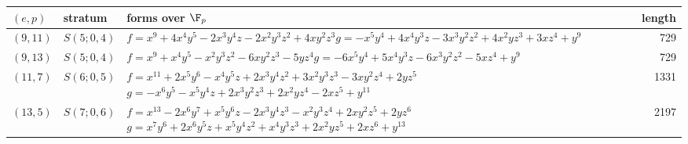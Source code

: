 \begin{tabular}{@{}ll>{\raggedright\arraybackslash}p{6.4cm}r@{}}
\toprule
$(e,p)$ & stratum & forms over $\F_p$ & length\\
\midrule
$(9,11)$ & $S(5;0,4)$ & $f=x^{9} + 4x^{4}y^{5} - 2x^{3}y^{4}z - 2x^{2}y^{3}z^{2} + 4xy^{2}z^{3}$\newline $g=-x^{5}y^{4} + 4x^{4}y^{3}z - 3x^{3}y^{2}z^{2} + 4x^{2}yz^{3} + 3xz^{4} + y^{9}$ & 729\\
$(9,13)$ & $S(5;0,4)$ & $f=x^{9} + x^{4}y^{5} - x^{2}y^{3}z^{2} - 6xy^{2}z^{3} - 5yz^{4}$\newline $g=-6x^{5}y^{4} + 5x^{4}y^{3}z - 6x^{3}y^{2}z^{2} - 5xz^{4} + y^{9}$ & 729\\
$(11,7)$ & $S(6;0,5)$ & $f=x^{11} + 2x^{5}y^{6} - x^{4}y^{5}z + 2x^{3}y^{4}z^{2} + 3x^{2}y^{3}z^{3} - 3xy^{2}z^{4} + 2yz^{5}$\newline $g=-x^{6}y^{5} - x^{5}y^{4}z + 2x^{3}y^{2}z^{3} + 2x^{2}yz^{4} - 2xz^{5} + y^{11}$ & 1331\\
$(13,5)$ & $S(7;0,6)$ & $f=x^{13} - 2x^{6}y^{7} + x^{5}y^{6}z - 2x^{3}y^{4}z^{3} - x^{2}y^{3}z^{4} + 2xy^{2}z^{5} + 2yz^{6}$\newline $g=x^{7}y^{6} + 2x^{6}y^{5}z + x^{5}y^{4}z^{2} + x^{4}y^{3}z^{3} + 2x^{2}yz^{5} + 2xz^{6} + y^{13}$ & 2197\\
\bottomrule
\end{tabular}
